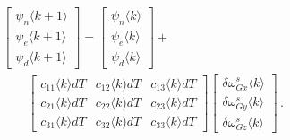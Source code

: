 \documentclass[journal]{IEEEtran}
\begin{document}
\begin{equation}\label{eq_disc2}
\begin{aligned}
&\begin{bmatrix}
 {{\psi}}_n\langle k+1\rangle \\
  {{\psi}}_e\langle k+1\rangle\\
   {{\psi}}_d\langle k+1\rangle
\end{bmatrix}=\begin{bmatrix}
 {{\psi}}_n\langle k\rangle \\
  {{\psi}}_e\langle k\rangle\\
   {{\psi}}_d\langle k\rangle
\end{bmatrix}+\\
&\qquad\begin{bmatrix}
    c_{11}\langle k\rangle dT & c_{12}\langle k)dT & c_{13}\langle k\rangle dT \\
    c_{21}\langle k\rangle dT & c_{22}\langle k)dT & c_{23}\langle k\rangle dT \\
    c_{31}\langle k\rangle dT & c_{32}\langle k)dT& c_{33}\langle k\rangle dT
    \end{bmatrix}\begin{bmatrix}
    \delta\omega_{Gx}^s\langle k\rangle \\
    \delta\omega_{Gy}^s\langle k\rangle \\
    \delta\omega_{Gz}^s\langle k\rangle
    \end{bmatrix}\,.
    \end{aligned}
\end{equation}
\end{document}

